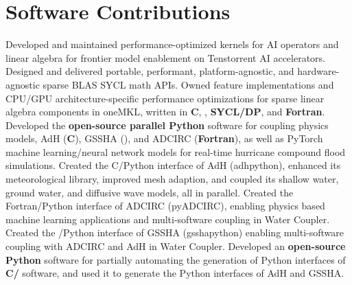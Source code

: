\documentclass[letterpaper,10pt]{article}
\begin{document}
\section{Software Contributions}
  \resumeSubItemListStart
      {Developed and maintained performance-optimized kernels for AI operators
      and linear algebra for frontier model enablement on Tenstorrent AI
      accelerators.}
      {Designed and delivered portable, performant, platform-agnostic,
      and hardware-agnostic sparse BLAS SYCL math APIs.}
      {Owned feature implementations and CPU/GPU architecture-specific
       performance optimizations for sparse linear algebra components in oneMKL,
       written in \textbf{C}, \textbf{\CC{}}, \textbf{SYCL/DP\CC{}}, and
       \textbf{Fortran}.}
      {Developed the \textbf{open-source parallel Python} software for coupling
      physics models, AdH (\textbf{C}), GSSHA (\textbf{\CC{}}), and ADCIRC
      (\textbf{Fortran}), as well as PyTorch machine learning/neural network
      models for real-time hurricane compound flood simulations.}
      {Created the C/Python interface of AdH (adhpython), enhanced its meteorological library,
      improved mesh adaption, and coupled its shallow water, ground
      water, and diffusive wave models, all in parallel.}
      {Created the Fortran/Python interface of ADCIRC (pyADCIRC), enabling physics
      based machine learning applications and multi-software coupling in Water
      Coupler.}
      {Created the \CC{}/Python interface of GSSHA (gsshapython) enabling
      multi-software coupling with ADCIRC and AdH in Water Coupler.}
      {Developed an \textbf{open-source Python} software for partially
      automating the generation of Python interfaces of \textbf{C/\CC{}}
      software, and used it to generate the Python interfaces of AdH and GSSHA.}
\end{document}
